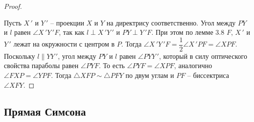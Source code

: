 \documentclass[12pt]{article}
\theoremstyle{definition}
\begin{document}
\begin{proof}
\begin{center}
        \end{center}
        Пусть $X\,'$ и $Y\,'$ -- проекции $X$ и $Y$ на директрису соответственно. Угол между $PY$ и $l$ равен $\angle X\,'Y\,'F$, так как $l\perp X\,'Y\,'$ и $PY\perp Y\,'F$. При этом по лемме 3.8 $F$, $X\,'$ и $Y\,'$ лежат на окружности с центром в $P$. Тогда $\angle X\,'Y\,'F=\dfrac{1}{2}\angle X\,'PF=\angle XPF$. Поскольку $l\parallel YY\,'$, угол между $PY$ и $l$ равен $\angle PYY\,'$, который в силу оптического свойства параболы равен $\angle PYF$. То есть $\angle PYF=\angle XPF$, аналогично $\angle FXP = \angle YPF$. Тогда $\triangle XFP \sim \triangle PFY$ по двум углам и $PF$ -- биссектриса $\angle XFY$.
    \end{proof}

\setcounter{subsection}{2}
\subsection{Прямая Симсона}
\end{document}
